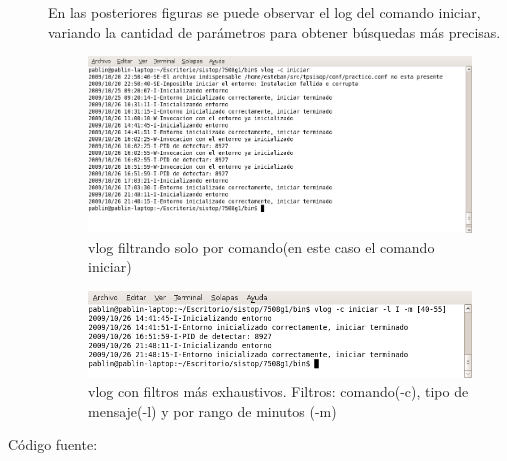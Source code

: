 \documentclass[12pt]{article}
\begin{document}
\begin{description}
        En las posteriores figuras se puede observar el log del comando iniciar, variando la cantidad de parámetros para obtener búsquedas más precisas.

	\begin{figure}[H]
	\centering
	\includegraphics[scale=0.45]{imagenes/vlog/vlog_filtro_comando.png}
	\caption{vlog filtrando solo por comando(en este caso el comando iniciar)}
	\end{figure}

	\begin{figure}[H]
	\centering
	\includegraphics[scale=0.55]{imagenes/vlog/vlog_comando_Tmsj_min.png}
	\caption{vlog con filtros más exhaustivos. Filtros: comando(-c), tipo de mensaje(-l) y por rango de minutos (-m)}
	\end{figure}

	\item [Código fuente:]
\end{description}
{\footnotesize

}

\end{document}
